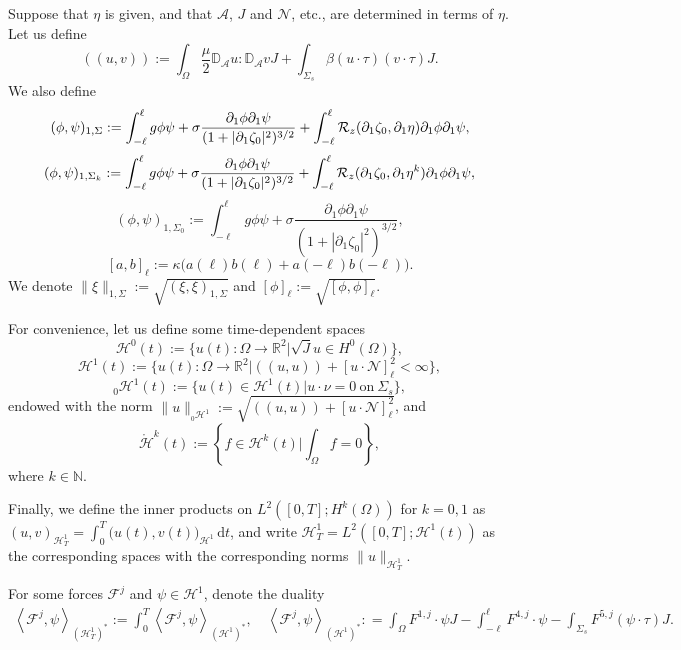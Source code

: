\documentclass[letterpaper,reqno,10pt,twoside]{amsart}
\theoremstyle{definition}
\theoremstyle{remark}
\def\p{\partial}
\def\Om{\Omega}
\begin{document}
	
	Suppose that $\eta$ is given, and that $\mathcal{A}$, $J$ and $\mathcal{N}$, etc., are determined in terms of $\eta$. Let us define
	\[
	((u,v)):=\int_{\Om}\frac{\mu}{2}\mathbb{D}_{\mathcal{A}}u:\mathbb{D}_{\mathcal{A}}vJ+\int_{\Sigma_s}\beta(u\cdot\tau)(v\cdot\tau)J.
	\]
	We also define
	\begin{equation}{\label{eq:inner_product}}
		(\phi,\psi)_{1,\Sigma}:=\int_{-\ell}^{\ell}g\phi\psi+\sigma\frac{\p_1\phi\p_1\psi}{(1+|\p_1\zeta_0|^2)^{3/2}}+\int_{-\ell}^{\ell}\mathcal{R}_{z}(\partial_{1}\zeta_{0},\partial_{1}\eta)\partial_{1}\phi\partial_{1}\psi,
	\end{equation}
	\begin{equation}{\label{eq:inner_product——1}}
		(\phi,\psi)_{1,\Sigma_{k}}:=\int_{-\ell}^{\ell}g\phi\psi+\sigma\frac{\p_1\phi\p_1\psi}{(1+|\p_1\zeta_0|^2)^{3/2}}+\int_{-\ell}^{\ell}\mathcal{R}_{z}(\partial_{1}\zeta_{0},\partial_{1}\eta^{k})\partial_{1}\phi\partial_{1}\psi,
	\end{equation}
	\[
	(\phi,\psi)_{1,\Sigma_{0}}:=\int_{-\ell}^{\ell}g\phi\psi+\sigma\frac{\p_1\phi\p_1\psi}{(1+|\p_1\zeta_0|^2)^{3/2}},
	\]
	\begin{equation}\label{sum_point}
		[a,b]_\ell:=\kappa\Big(a(\ell)b(\ell)+a(-\ell)b(-\ell)\Big).
	\end{equation}
	We denote $\|\xi\|_{1,\Sigma}:=\sqrt{(\xi,\xi)_{1,\Sigma}}$ and $[\phi]_\ell :=\sqrt{[\phi,\phi]_\ell}$.
	
	For convenience, let us define some time-dependent spaces
	\[
	\mathcal{H}^0(t):=\Big\{u(t):\Om\rightarrow\mathbb{R}^2\Big|\sqrt{J}u\in H^0(\Om)\Big\},
	\]
	\[
	\mathcal{H}^1(t):=\Big\{u(t):\Om\rightarrow\mathbb{R}^2\Big|((u,u))+[u\cdot \mathcal{N}]_{\ell}^2<\infty \Big\},
	\]
	\[
	{}_0\mathcal{H}^1(t):=\Big\{u(t)\in \mathcal{H}^1(t)\Big|u\cdot\nu=0\ \text{on}\ \Sigma_s\Big\},
	\]
	endowed with the norm $\|u\|_{{}_0\mathcal{H}^1}:= \sqrt{ ((u,u))+[u\cdot \mathcal{N}]_{\ell}^2 }$, and 
	\[
	\mathring{\mathcal{H}}^k(t):=\left\{f\in \mathcal{H}^k(t)\Big| \int_\Om f=0\right\},
	\]
	where $k\in\mathbb{N}$.
	
	Finally, we define the inner products on $L^2([0, T]; H^k(\Om))$ for $k=0,1$ as
	$
	(u,v)_{\mathcal{H}^1_T}=\int_0^T\big(u(t),v(t)\big)_{\mathcal{H}^1}\,\mathrm{d}t$,
	and write $\mathcal{H}^1_T = L^2([0, T]; \mathcal{H}^1(t))$ as the corresponding spaces with the corresponding norms $\|u\|_{\mathcal{H}^1_T}$.
	
	For some forces $\mathcal{F}^j$ and $\psi \in \mathcal{H}^1$, denote the duality
	\begin{align}\label{duality}
		\left<\mathcal{F}^j,\psi\right>_{(\mathcal{H}^1_T)^\ast} :=\int_0^T\left<\mathcal{F}^j,\psi\right>_{(\mathcal{H}^1)^\ast},\quad \left<\mathcal{F}^j,\psi\right>_{(\mathcal{H}^1)^\ast}: =\int_{\Om}F^{1,j}\cdot \psi J-\int_{-\ell}^{\ell}F^{4,j}\cdot \psi-\int_{\Sigma_s}F^{5,j}(\psi\cdot\tau)J.
	\end{align}
	
\end{document}
